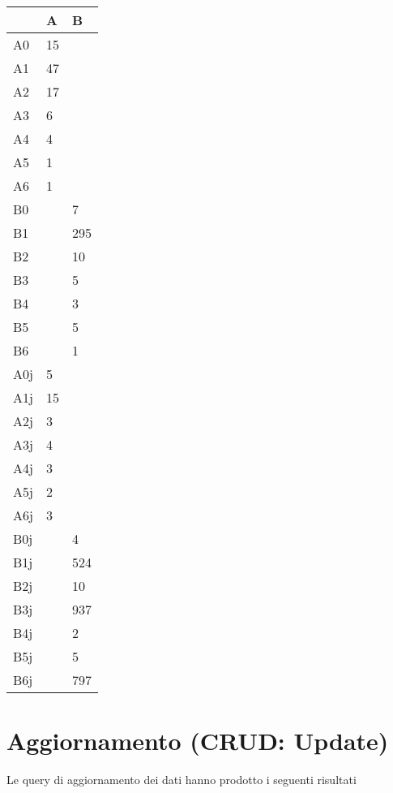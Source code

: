 \begin{table}[!ht]
    \centering
    \begin{tabular}{|l|l|l|}
    \hline
        ~ & A & B \\ \hline
        A0 & 15 & ~ \\ \hline
        A1 & 47 & ~ \\ \hline
        A2 & 17 & ~ \\ \hline
        A3 & 6 & ~ \\ \hline
        A4 & 4 & ~ \\ \hline
        A5 & 1 & ~ \\ \hline
        A6 & 1 & ~ \\ \hline
        B0 & ~ & 7 \\ \hline
        B1 & ~ & 295 \\ \hline
        B2 & ~ & 10 \\ \hline
        B3 & ~ & 5 \\ \hline
        B4 & ~ & 3 \\ \hline
        B5 & ~ & 5 \\ \hline
        B6 & ~ & 1 \\ \hline
        A0j & 5 & ~ \\ \hline
        A1j & 15 & ~ \\ \hline
        A2j & 3 & ~ \\ \hline
        A3j & 4 & ~ \\ \hline
        A4j & 3 & ~ \\ \hline
        A5j & 2 & ~ \\ \hline
        A6j & 3 & ~ \\ \hline
        B0j & ~ & 4 \\ \hline
        B1j & ~ & 524 \\ \hline
        B2j & ~ & 10 \\ \hline
        B3j & ~ & 937 \\ \hline
        B4j & ~ & 2 \\ \hline
        B5j & ~ & 5 \\ \hline
        B6j & ~ & 797 \\ \hline
    \end{tabular}
\end{table}


\section{Aggiornamento (CRUD: Update)}

Le query di aggiornamento dei dati hanno prodotto i seguenti risultati 